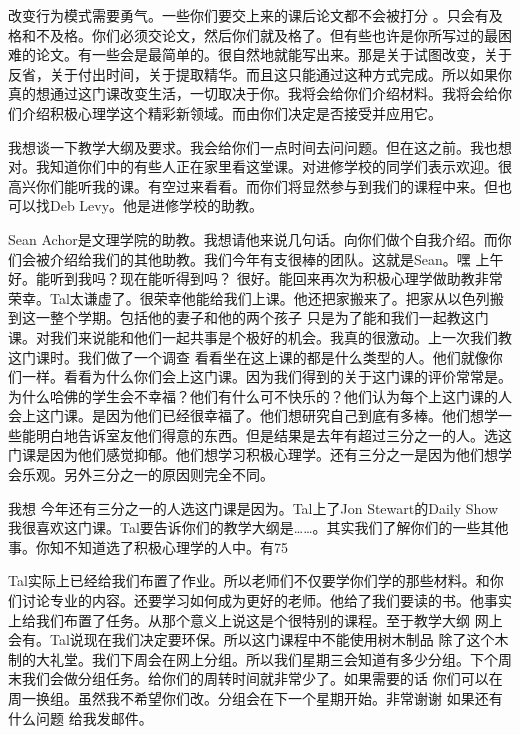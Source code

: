 改变行为模式需要勇气。一些你们要交上来的课后论文都不会被打分 。只会有及格和不及格。你们必须交论文，然后你们就及格了。但有些也许是你所写过的最困难的论文。有一些会是最简单的。很自然地就能写出来。那是关于试图改变，关于反省，关于付出时间，关于提取精华。而且这只能通过这种方式完成。所以如果你真的想通过这门课改变生活，一切取决于你。我将会给你们介绍材料。我将会给你们介绍积极心理学这个精彩新领域。而由你们决定是否接受并应用它。

我想谈一下教学大纲及要求。我会给你们一点时间去问问题。但在这之前。我也想对。我知道你们中的有些人正在家里看这堂课。对进修学校的同学们表示欢迎。很高兴你们能听我的课。有空过来看看。而你们将显然参与到我们的课程中来。但也可以找Deb Levy。他是进修学校的助教。 

Sean Achor是文理学院的助教。我想请他来说几句话。向你们做个自我介绍。而你们会被介绍给我们的其他助教。我们今年有支很棒的团队。这就是Sean。嘿 上午好。能听到我吗？现在能听得到吗？ 很好。能回来再次为积极心理学做助教非常荣幸。Tal太谦虚了。很荣幸他能给我们上课。他还把家搬来了。把家从以色列搬到这一整个学期。包括他的妻子和他的两个孩子 只是为了能和我们一起教这门课。对我们来说能和他们一起共事是个极好的机会。我真的很激动。上一次我们教这门课时。我们做了一个调查 看看坐在这上课的都是什么类型的人。他们就像你们一样。看看为什么你们会上这门课。因为我们得到的关于这门课的评价常常是。为什么哈佛的学生会不幸福？他们有什么可不快乐的？他们认为每个上这门课的人会上这门课。是因为他们已经很幸福了。他们想研究自己到底有多棒。他们想学一些能明白地告诉室友他们得意的东西。但是结果是去年有超过三分之一的人。选这门课是因为他们感觉抑郁。他们想学习积极心理学。还有三分之一是因为他们想学会乐观。另外三分之一的原因则完全不同。 

我想 今年还有三分之一的人选这门课是因为。Tal上了Jon Stewart的Daily Show 我很喜欢这门课。Tal要告诉你们的教学大纲是……。其实我们了解你们的一些其他事。你知不知道选了积极心理学的人中。有75%

Tal实际上已经给我们布置了作业。所以老师们不仅要学你们学的那些材料。和你们讨论专业的内容。还要学习如何成为更好的老师。他给了我们要读的书。他事实上给我们布置了任务。从那个意义上说这是个很特别的课程。至于教学大纲 网上会有。Tal说现在我们决定要环保。所以这门课程中不能使用树木制品 除了这个木制的大礼堂。我们下周会在网上分组。所以我们星期三会知道有多少分组。下个周末我们会做分组任务。给你们的周转时间就非常少了。如果需要的话 你们可以在周一换组。虽然我不希望你们改。分组会在下一个星期开始。非常谢谢 如果还有什么问题 给我发邮件。 

